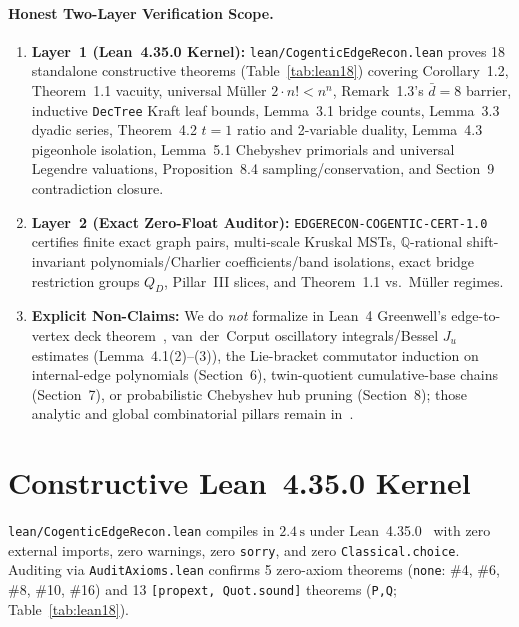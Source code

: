 \documentclass[10pt,twocolumn]{article}
\newcommand{\QQ}{\mathbb{Q}}
\begin{document}
\paragraph{Honest Two-Layer Verification Scope.}
\begin{enumerate}[leftmargin=1.2em,itemsep=1pt,topsep=2pt]
  \item \textbf{Layer~1 (Lean~4.35.0 Kernel):} \nolinkurl{lean/CogenticEdgeRecon.lean} proves 18 standalone constructive theorems (Table~\ref{tab:lean18}) covering Corollary~1.2, Theorem~1.1 vacuity, universal M\"uller $2\cdot n!<n^n$, Remark~1.3's $\bar{d}=8$ barrier, inductive \texttt{DecTree} Kraft leaf bounds, Lemma~3.1 bridge counts, Lemma~3.3 dyadic series, Theorem~4.2 $t{=}1$ ratio and 2-variable duality, Lemma~4.3 pigeonhole isolation, Lemma~5.1 Chebyshev primorials and universal Legendre valuations, Proposition~8.4 sampling/conservation, and Section~9 contradiction closure.
  \item \textbf{Layer~2 (Exact Zero-Float Auditor):} \nolinkurl{EDGERECON-COGENTIC-CERT-1.0} certifies finite exact graph pairs, multi-scale Kruskal MSTs, $\QQ$-rational shift-invariant polynomials/Charlier coefficients/band isolations, exact bridge restriction groups $Q_D$, Pillar~III slices, and Theorem~1.1 vs.\ M\"uller regimes.
  \item \textbf{Explicit Non-Claims:} We do \emph{not} formalize in Lean~4 Greenwell's edge-to-vertex deck theorem~\cite{greenwell1971reconstructing}, van~der~Corput oscillatory integrals\slash Bessel $J_u$ estimates (Lemma~4.1(2)--(3)), the Lie-bracket commutator induction on internal-edge polynomials (Section~6), twin-quotient cumulative-base chains (Section~7), or probabilistic Chebyshev hub pruning (Section~8); those analytic and global combinatorial pillars remain in~\cite{cogentic2026edgerecon}.
\end{enumerate}

\section{Constructive Lean~4.35.0 Kernel}\label{sec:lean}
\nolinkurl{lean/CogenticEdgeRecon.lean} compiles in $2.4\,\mathrm{s}$ under Lean~4.35.0~\cite{demoura2021lean4} with zero external imports, zero warnings, zero \texttt{sorry}, and zero \texttt{Classical.choice}. Auditing via \nolinkurl{AuditAxioms.lean} confirms 5 zero-axiom theorems (\texttt{none}: \#4, \#6, \#8, \#10, \#16) and 13 \texttt{[propext, Quot.sound]} theorems (\texttt{P,Q}; Table~\ref{tab:lean18}).
\end{document}
